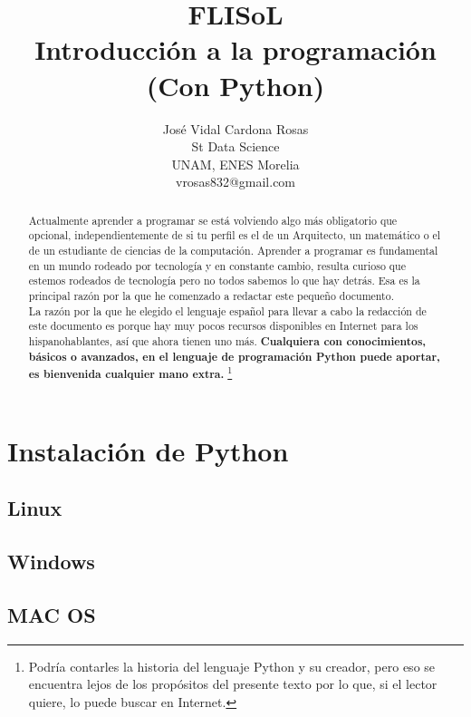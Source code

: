 \documentclass[a4paper,10pt]{article}
\title{FLISoL\\Introducción a la programación\\
(Con Python)}
\author{José Vidal Cardona Rosas\\
St Data Science\\
UNAM, ENES Morelia\\
vrosas832@gmail.com}
\begin{document}
\maketitle

\begin{abstract}
    Actualmente aprender a programar se está volviendo algo más obligatorio 
    que opcional, independientemente de si tu perfil es el de un Arquitecto, 
    un matemático o el de un estudiante de ciencias de la computación. Aprender 
    a programar es fundamental en un mundo rodeado por tecnología y en 
    constante cambio, resulta curioso que estemos rodeados de tecnología pero 
    no todos sabemos lo que hay detrás. Esa es la principal razón por la
    que he comenzado a redactar este pequeño documento.
    \\
    
    La razón por la que he elegido el lenguaje español para llevar a cabo 
    la redacción de este documento es porque hay muy pocos recursos disponibles
    en Internet para los hispanohablantes, así que ahora tienen uno más.
    \textbf{Cualquiera con conocimientos, básicos o avanzados, en el lenguaje 
    de programación Python puede aportar, es bienvenida cualquier mano extra.}
    \footnote{Podría contarles la historia del lenguaje Python
    y su creador, pero eso se encuentra lejos de los propósitos del presente 
    texto por lo que, si el lector quiere, lo puede buscar en Internet.}
\end{abstract}

\section{Instalación de Python}
\subsection{Linux}
\subsection{Windows}
\subsection{MAC OS}
\end{document}

